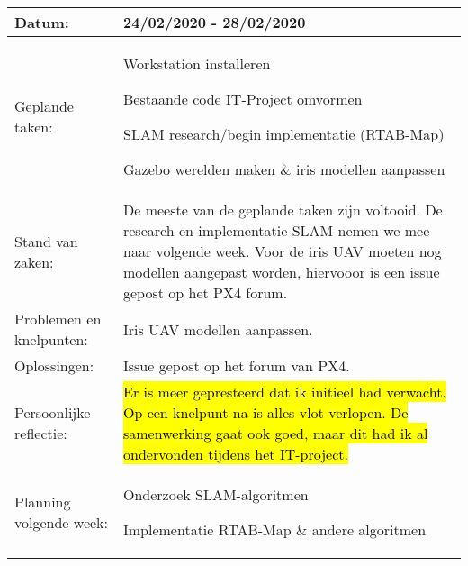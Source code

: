 \begin{tabularx}{\textwidth}{| l | X |}
  \hline
  Datum: & 24/02/2020 - 28/02/2020\\
  \hline
  Geplande taken: &
  \begin{compactitem}
    \item Workstation installeren
    \item Bestaande code IT-Project omvormen
    \item SLAM research/begin implementatie (RTAB-Map)
    \item Gazebo werelden maken \& iris modellen aanpassen
  \end{compactitem}\\
  \hline
  Stand van zaken: & De meeste van de geplande taken zijn voltooid. De research en implementatie SLAM nemen we mee naar volgende week. Voor de iris UAV moeten nog  modellen aangepast worden, hiervooor is een issue gepost op het PX4 forum.\\
  \hline
  Problemen en knelpunten: & Iris UAV modellen aanpassen.\\
  \hline
  Oplossingen: & Issue gepost op het forum van PX4.\\
  \hline
  Persoonlijke reflectie: & \hl{Er is meer gepresteerd dat ik initieel had verwacht. Op een knelpunt na is alles vlot verlopen. De samenwerking gaat ook goed, maar dit had ik al ondervonden tijdens het IT-project.}\\
  \hline
  Planning volgende week: &
  \begin{compactitem}
    \item Onderzoek SLAM-algoritmen
    \item Implementatie RTAB-Map \& andere algoritmen
  \end{compactitem}\\
  \hline
\end{tabularx}